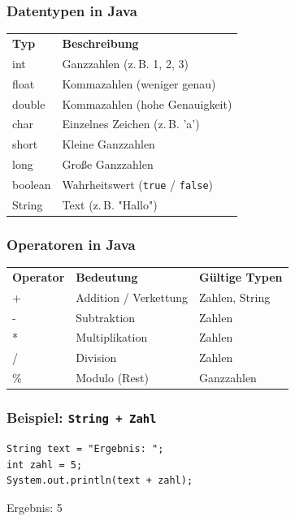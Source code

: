 \documentclass{../../presentation}
\begin{document}
\begin{frame}
  \frametitle{Datentypen in Java}
  \pause
  \centering
  \begin{tabular}{l l}
    \rowcolor{tablehead}
    \textbf{Typ} & \textbf{Beschreibung}                          \\
    int          & Ganzzahlen (z.\,B. 1, 2, 3)                    \\
    float        & Kommazahlen (weniger genau)                    \\
    double       & Kommazahlen (hohe Genauigkeit)                 \\
    char         & Einzelnes Zeichen (z.\,B. 'a')                 \\
    short        & Kleine Ganzzahlen                              \\
    long         & Große Ganzzahlen                               \\
    boolean      & Wahrheitswert (\texttt{true} / \texttt{false}) \\
    String       & Text (z.\,B. "Hallo")                          \\
  \end{tabular}
\end{frame}


\begin{frame}
  \frametitle{Operatoren in Java}
  \pause
  \centering
  \begin{tabular}{l l l}
    \rowcolor{tablehead}
    \textbf{Operator} & \textbf{Bedeutung}    & \textbf{Gültige Typen} \\
    +                 & Addition / Verkettung & Zahlen, String         \\
    -                 & Subtraktion           & Zahlen                 \\
    *                 & Multiplikation        & Zahlen                 \\
    /                 & Division              & Zahlen                 \\
    \%                & Modulo (Rest)         & Ganzzahlen             \\
  \end{tabular}
\end{frame}

\begin{frame}[fragile]
  \frametitle{Beispiel: \texttt{String + Zahl}}
  \pause
  \begin{verbatim}
String text = "Ergebnis: ";
int zahl = 5;
System.out.println(text + zahl);
  \end{verbatim}
  \pause
  \begin{ausgabe}
    Ergebnis: 5
  \end{ausgabe}
\end{frame}
\end{document}
